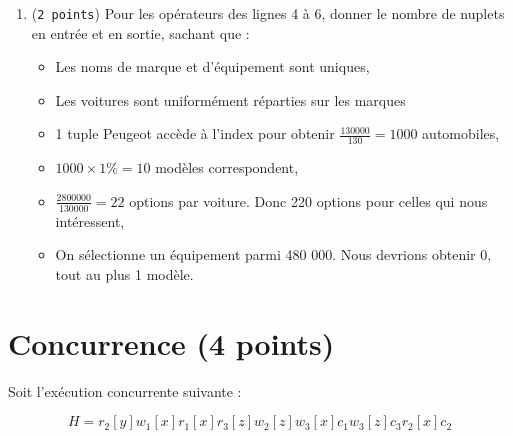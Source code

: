 \begin{enumerate}
    \item ({\tt 2~points}) Pour les opérateurs des lignes 4 à 6, donner le nombre de nuplets en entrée et en sortie, sachant que :
\begin{itemize}
  \item Les noms de marque et d'équipement sont uniques,
  \item Les voitures sont uniformément réparties sur les marques
\end{itemize}
\begin{solution}
\begin{itemize}
  \item 1 tuple Peugeot accède à l'index pour obtenir $\frac{130 000}{130} =  1 000$ automobiles,
  \item $1000 \times 1\% = 10$ modèles correspondent,
  \item $\frac{2800000}{130000} = 22$ options par voiture. Donc 220 options pour celles qui nous intéressent,
  \item On sélectionne un équipement parmi 480 000. Nous devrions obtenir 0, tout au plus 1 modèle.
\end{itemize}
\end{solution}
\end{enumerate}


\section{Concurrence (4 points)}

Soit l'exécution concurrente suivante :

$$H = r_2[y] w_1[x] r_1[x] r_3[z] w_2[z] w_3[x] c_1 w_3[z] c_3 r_2[x] c_2$$


